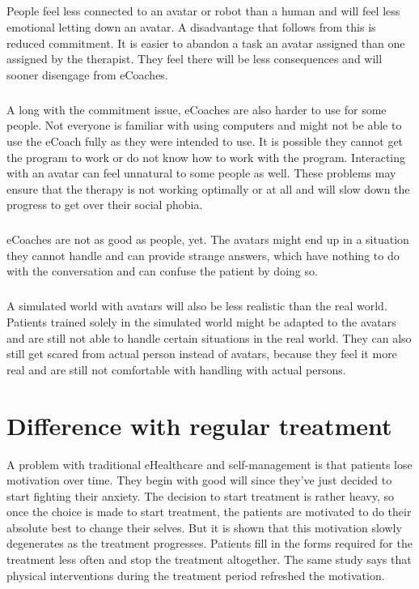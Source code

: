 \documentclass[english,a4paper,pdftex]{report}
\begin{document}
\paragraph{}
\cite{clutterbuck2009virtual}People feel less connected to an avatar or robot than a human and will feel less emotional letting down an avatar. A disadvantage that follows from this is reduced commitment. It is easier to abandon a task an avatar assigned than one assigned by the therapist. They feel there will be less consequences and will sooner disengage from eCoaches.
\paragraph{}
A long with the commitment issue, eCoaches are also harder to use for some people. Not everyone is familiar with using computers and might not be able to use the eCoach fully as they were intended to use. It is possible they cannot get the program to work or do not know how to work with the program. Interacting with an avatar can feel unnatural to some people as well. These problems may ensure that the therapy is not working optimally or at all and will slow down the progress to get over their social phobia.
\paragraph{}
eCoaches are not as good as people, yet. The avatars might end up in a situation they cannot handle and can provide strange answers, which have nothing to do with the conversation and can confuse the patient by doing so. 
\paragraph{}
A simulated world with avatars will also be less realistic than the real world. Patients trained solely in the simulated world might be adapted to the avatars and are still not able to handle certain situations in the real world. They can also still get scared from actual person instead of avatars, because they feel it more real and are still not comfortable with handling with actual persons.  


\chapter{Difference with regular treatment}
A problem with traditional eHealthcare and self-management is that patients lose motivation over time. They begin with good will since they've just decided to start fighting their anxiety. The decision to start treatment is rather heavy, so once the choice is made to start treatment, the patients are motivated to do their absolute best to change their selves. But it is shown \cite{alpay2007} that this motivation slowly degenerates as the treatment progresses. Patients fill in the forms required for the treatment less often and stop the treatment altogether. The same study says that physical interventions during the treatment period refreshed the motivation.
\end{document}
